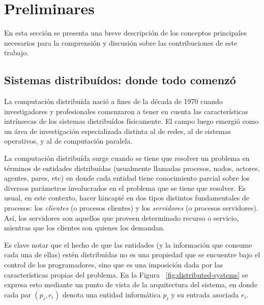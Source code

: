 \section{Preliminares}\label{sec:prelim}


En esta sección se presenta una breve descripción de los conceptos principales
necesarios para la comprensión y discusión sobre las
contribuciones de este trabajo.

\subsection{Sistemas distribuídos: donde todo comenzó}

La computación distribuída nació a fines de la década de 1970 cuando investigadores y profesionales
comenzaron a tener en cuenta las características intrínsecas de los sistemas distribuídos físicamente.
El campo luego emergió como un área de investigación especializada distinta al de redes, al de sistemas
operativos, y al de computación paralela.~\cite{raynal.dist.systems}

La computación distribuída surge cuando se tiene que resolver un problema en términos de entidades
distribuídas (usualmente llamadas procesos, nodos, actores, agentes, pares, etc) en donde cada
entidad tiene conocimiento parcial sobre los diversos parámetros involucrados en el problema que
se tiene que resolver.
Es usual, en este contexto, hacer hincapié en dos tipos distintos fundamentales de procesos:
los \textit{clientes} (o procesos clientes) y los \textit{servidores} (o procesos servidores).
Así, los servidores son aquellos que proveen determinado recurso o servicio, mientras que los
clientes son quienes los demandan.

Es clave notar que el hecho de que las entidades (y la información que consume cada una de ellas)
estén distribuídas no es una propiedad que se encuentre bajo el control de los programadores, sino 
que es una imposición dada por las características propias del problema. En la 
Figura ~\ref{fig:distributed-systems} se expresa esto mediante un punto de vista
de la arquitectura del sistema, en donde cada par $(p_i, e_i)$ denota una entidad informática $p_i$ y su
entrada asociada $e_i$.

